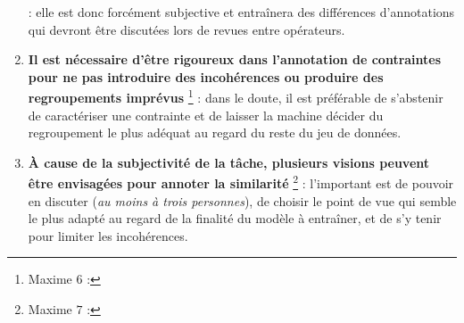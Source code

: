 \begin{enumerate}
{			} : elle est donc forcément subjective et entraînera des différences d'annotations qui devront être discutées lors de revues entre opérateurs.
			\item \textbf{Il est nécessaire d'être rigoureux dans l'annotation de contraintes pour ne pas introduire des incohérences ou produire des regroupements imprévus} \footnote{
				Maxime $6$ : 
			} :
			dans le doute, il est préférable de s'abstenir de caractériser une contrainte et de laisser la machine décider du regroupement le plus adéquat au regard du reste du jeu de données.
			\item \textbf{À cause de la subjectivité de la tâche, plusieurs visions peuvent être envisagées pour annoter la similarité} \footnote{
				Maxime $7$ : 
			} :
			l'important est de pouvoir en discuter (\textit{au moins à trois personnes}), de choisir le point de vue qui semble le plus adapté au regard de la finalité du modèle à entraîner, et de s'y tenir pour limiter les incohérences.
		\end{enumerate}